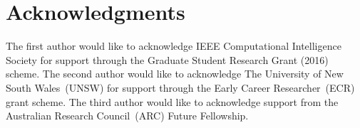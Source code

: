 \documentclass{sig-alternate}
\begin{document}
\section*{Acknowledgments}

The first author would like to acknowledge IEEE Computational Intelligence Society for support through the Graduate Student Research Grant (2016) scheme. The second author would like to acknowledge The University of New South Wales~(UNSW) for support through the Early Career Researcher~(ECR) grant scheme. The third author would like to acknowledge support from the Australian Research Council~(ARC) Future Fellowship. 


\small{}
\balance
\end{document}
